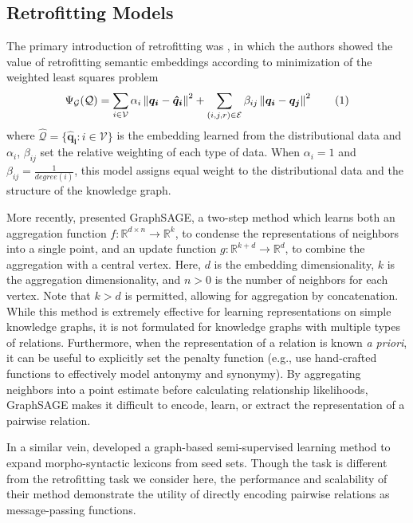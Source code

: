 \documentclass[11pt, a4paper]{article}
\newcommand\numberthis{\addtocounter{equation}{1}\tag{\theequation}}
\newcommand{\norm}[1]{\left\lVert#1\right\rVert}
\begin{document}
\subsection{Retrofitting Models}
The primary introduction of retrofitting was , in which the authors showed the value of retrofitting semantic embeddings according to minimization of the weighted least squares problem
\begin{displaymath}
\Psi_{\mathcal{G}}(\mathcal{Q}) = \sum_{i\in\mathcal{V}}\alpha_i\norm{\boldsymbol{q_i} - \boldsymbol{\hat{q}_i}}^2 + \sum_{(i,j,r)\in \mathcal{E}}\beta_{ij}\norm{\boldsymbol{q_i} - \boldsymbol{q_j}}^2 \numberthis{}
\label{eq:faruqui}
\end{displaymath}
where $\hat{\mathcal{Q}} = \{\boldsymbol{\hat{q}_i}: i \in \mathcal{V}\}$ is the embedding learned from the distributional data and $\alpha_i$, $\beta_{ij}$ set the relative weighting of each type of data. When $\alpha_i=1$ and $\beta_{ij} = \frac{1}{degree(i)}$, this model assigns equal weight to the distributional data and the structure of the knowledge graph.

More recently,  presented GraphSAGE, a two-step method which learns both an aggregation function $f: \mathbb{R}^{d\times n}\rightarrow \mathbb{R}^{k}$, to condense the representations of neighbors into a single point, and an update function $g: \mathbb{R}^{k+d}\rightarrow \mathbb{R}^d$, to combine the aggregation with a central vertex. Here, $d$ is the embedding dimensionality, $k$ is the aggregation dimensionality, and $n>0$ is the number of neighbors for each vertex. Note that $k>d$ is permitted, allowing for aggregation by concatenation. While this method is extremely effective for learning representations on simple knowledge graphs, it is not formulated for knowledge graphs with multiple types of relations. Furthermore, when the representation of a relation is known \textit{a priori}, it can be useful to explicitly set the penalty function (e.g.,  use hand-crafted functions to effectively model antonymy and synonymy). By aggregating neighbors into a point estimate before calculating relationship likelihoods, GraphSAGE makes it difficult to encode, learn, or extract the representation of a pairwise relation.

In a similar vein,  developed a graph-based semi-supervised learning method to expand morpho-syntactic lexicons from seed sets. Though the task is different from the retrofitting task we consider here, the performance and scalability of their method demonstrate the utility of directly encoding pairwise relations as message-passing functions.
\end{document}
